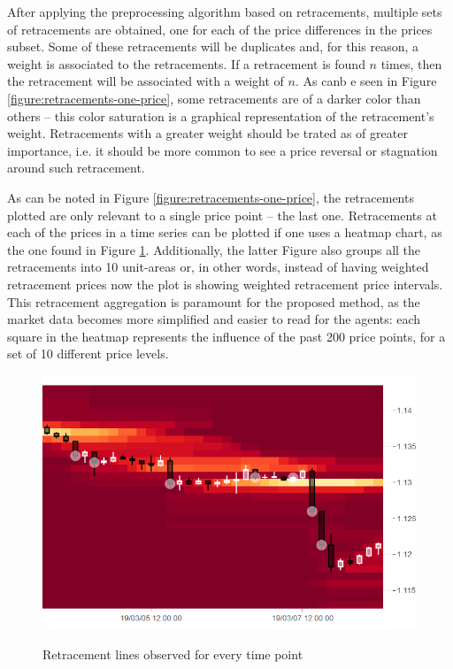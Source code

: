 After applying the preprocessing algorithm based on retracements, multiple sets
of retracements are obtained, one for each of the price differences in the
prices subset. Some of these retracements will be duplicates and, for this
reason, a weight is associated to the retracements. If a retracement is found
$n$ times, then the retracement will be associated with a weight of $n$. As canb
e seen in Figure \ref{figure:retracements-one-price}, some retracements are of a
darker color than others -- this color saturation is a graphical representation
of the retracement's weight. Retracements with a greater weight should be trated
as of greater importance, i.e. it should be more common to see a price reversal
or stagnation around such retracement.

As can be noted in Figure \ref{figure:retracements-one-price}, the retracements
plotted are only relevant to a single price point -- the last one. Retracements
at each of the prices in a time series can be plotted if one uses a heatmap
chart, as the one found in Figure
\ref{figure:retracements-all-prices}. Additionally, the latter Figure also
groups all the retracements into 10 unit-areas or, in other words, instead of
having weighted retracement prices now the plot is showing weighted retracement
price intervals. This retracement aggregation is paramount for the proposed
method, as the market data becomes more simplified and easier to read for the
agents: each square in the heatmap represents the influence of the past 200
price points, for a set of 10 different price levels.

\begin{figure}
\caption{Retracement lines observed for every time point} \centering
\includegraphics[width=1.0\textwidth]{img/retracements-preprocessing-all-prices.png}
\label{figure:retracements-all-prices}
\end{figure}

